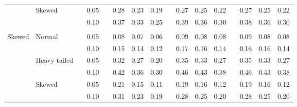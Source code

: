 \documentclass{article} %
\begin{document}
\begin{table}[ht]
\begin{scriptsize}
\begin{center}
\begin{tabular}{ll p{.1cm} c p{.1cm} rrr p{.1cm} rrr p{.1cm} rrr}
             & Skewed       && 0.05 &&   0.28 & 0.23 & 0.19 && 0.27 & 0.25 & 0.22 && 0.27 & 0.25 & 0.22 \\ 
             &              && 0.10 &&   0.37 & 0.33 & 0.25 && 0.39 & 0.36 & 0.30 && 0.38 & 0.36 & 0.30 \\
             &&&&&&&&&&&&&&&\\ 
Skewed       & Normal       && 0.05 &&   0.08 & 0.07 & 0.06 && 0.09 & 0.08 & 0.08 && 0.09 & 0.08 & 0.08 \\ 
             &              && 0.10 &&   0.15 & 0.14 & 0.12 && 0.17 & 0.16 & 0.14 && 0.16 & 0.16 & 0.14 \\ 
             & Heavy tailed && 0.05 &&   0.32 & 0.27 & 0.20 && 0.35 & 0.33 & 0.27 && 0.35 & 0.33 & 0.27 \\ 
             &              && 0.10 &&   0.42 & 0.36 & 0.30 && 0.46 & 0.43 & 0.38 && 0.46 & 0.43 & 0.38 \\ 
             & Skewed       && 0.05 &&   0.21 & 0.15 & 0.11 && 0.19 & 0.16 & 0.12 && 0.19 & 0.16 & 0.12 \\ 
             &              && 0.10 &&   0.31 & 0.23 & 0.19 && 0.28 & 0.25 & 0.20 && 0.28 & 0.25 & 0.20 \\ 



\end{tabular}
\end{center}
\end{scriptsize}
\end{table}
\end{document}

